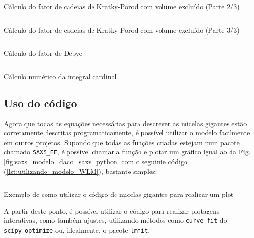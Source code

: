 \begin{apendicesenv}
	\begin{listing}[H]
		\inputminted{python}{./python/cadeia_kratky_porod_inicial_2.py}
		\caption{Cálculo do fator de cadeias de Kratky-Porod com volume excluído (Parte 2/3)}
		\label{lst:cadeia_KP_2}
	\end{listing}

	\begin{listing}[H]
		\inputminted{python}{./python/cadeia_kratky_porod_inicial_3.py}
		\caption{Cálculo do fator de cadeias de Kratky-Porod com volume excluído (Parte 3/3)}
		\label{lst:cadeia_KP_3}
	\end{listing}

	\begin{listing}[H]
		\inputminted{python}{./python/cadeia_kratky_porod_inicial_4.py}
		\caption{Cálculo do fator de Debye}
		\label{lst:cadeia_KP_Debye}
	\end{listing}

	\begin{listing}[H]
		\inputminted{python}{./python/cadeia_kratky_porod_inicial_5.py}
		\caption{Cálculo numérico da integral cardinal}  %
		\label{lst:cadeia_KP_SI}
	\end{listing}

\subsection{Uso do código}

Agora que todas as equações necessárias para descrever as micelas gigantes estão corretamente descritas programaticamente, é possível utilizar o modelo facilmente em outros projetos. Supondo que todas as funções criadas estejam num pacote chamado \texttt{SAXS\_FF}, é possível chamar a função e plotar um gráfico igual ao da Fig. \ref{fig:saxs_modelo_dado_saxs_python} com o seguinte código (\ref{lst:utilizando_modelo_WLM}), bastante simples:

\begin{listing}[H]
 	\inputminted{python}{./python/uso_modelo.py}
 	\caption{Exemplo de como utilizar o código de micelas gigantes para realizar um plot}  %
 	\label{lst:utilizando_modelo_WLM}
\end{listing}
	
A partir deste ponto, é possível utilizar o código para realizar plotagens interativas, como também ajustes, utilizando métodos como \texttt{curve\_fit} do \texttt{scipy.optimize} ou, idealmente, o pacote \texttt{lmfit}.


\end{apendicesenv}

